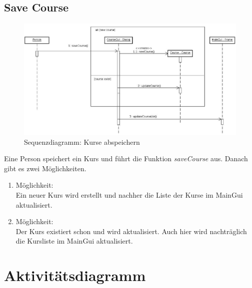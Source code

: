 \subsection{Save Course}
\begin{figure}[ht]
\begin{center}
\includegraphics[width=15cm]{images/saveCourse.png}
\caption{Sequenzdiagramm:  Kurse abspeichern}
\end{center}
\end{figure}
Eine Person speichert ein Kurs und führt die Funktion \textit{saveCourse} aus. Danach gibt es
zwei Möglichkeiten.
\begin{enumerate}
\item Möglichkeit:\\
Ein neuer Kurs wird erstellt und nachher die Liste der Kurse im MainGui aktualisiert.
%
\item Möglichkeit:\\
Der Kurs existiert schon und wird aktualisiert. Auch hier wird nachträglich die Kursliste im
MainGui aktualisiert.
\end{enumerate}
\clearpage
\section{Aktivitätsdiagramm}
